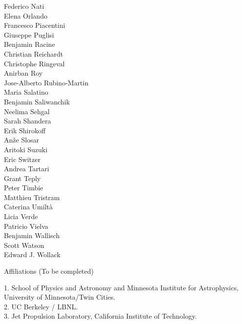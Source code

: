 \documentclass[PICOReport.tex]{subfiles}
\begin{document}
{{\begin{multicols}{4}
Federico Nati                   \\
Elena Orlando                   \\
Francesco Piacentini            \\
Giuseppe Puglisi                \\
Benjamin Racine                 \\
Christian Reichardt             \\
Christophe Ringeval                  \\
Anirban Roy                     \\
Jose-Alberto Rubino-Martin      \\
Maria Salatino                  \\
Benjamin Saliwanchik            \\
Neelima Sehgal                  \\
Sarah Shandera                  \\
Erik Shirokoff                  \\
An\v{z}e Slosar                 \\
Aritoki Suzuki                  \\
Eric Switzer                    \\
Andrea Tartari                  \\
Grant Teply                     \\
Peter Timbie                    \\
Matthieu Tristram               \\
Caterina Umilt\`{a}             \\
Licia Verde                     \\
Patricio Vielva                 \\
Benjamin Wallisch               \\
Scott Watson                    \\
Edward J. Wollack               
\end{multicols}
}

\newpage
\Large  {\centerline {Affiliations  (To be completed)}}

\footnotesize {
1. School of Physics and Astronomy and Minnesota Institute for Astrophysics, University of Minnesota/Twin Cities.\\
2. UC Berkeley / LBNL.\\
3. Jet Propulsion Laboratory, California Institute of Technology.
}}
\end{document}
